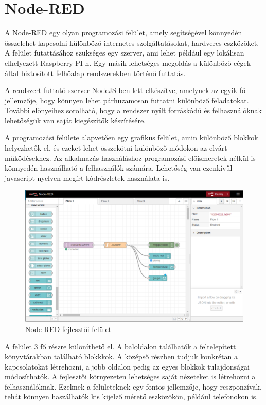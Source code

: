 \section{Node-RED}
A Node-RED egy olyan programozási felület, amely segítségével könnyedén összelehet kapcsolni különböző internetes szolgáltatásokat, hardveres eszközöket. A felület futattásához szükséges egy szerver, ami lehet például egy lokálisan elhelyezett Raspberry PI-n. Egy másik lehetséges megoldás a különböző cégek által biztosított felhőalap rendszerekben történő futtatás.

A rendszert futtató szerver NodeJS-ben lett elkészítve, amelynek az egyik fő jellemzője, hogy könnyen lehet párhuzamosan futtatni különböző feladatokat. További előnyeihez sorolható, hogy a rendszer nyílt forráskódú és felhasználóknak lehetőségük van saját kiegészítők készítésére.

A programozási felülete alapvetően egy grafikus felület, amin különböző blokkok helyezhetők el, és ezeket lehet összekötni különböző módokon az elvárt működésekhez. Az alkalmazás használáshoz programozási előismeretek nélkül is könnyedén használható a felhasználók számára. Lehetőség van ezenkívűl javascript nyelven megírt kódrészletek használata is.

\begin{figure}[!ht]
    \centering
    \includegraphics[width=150mm, keepaspectratio]{figures/nodered.png}
    \caption{Node-RED fejlesztői felület}
    \label{fig:nodered_development}
\end{figure}

A felület 3 fő részre különíthető el. A baloldalon találhatók a feltelepített könyvtárakban található blokkkok. A középső részben tudjuk konkrétan a kapcsolatokat létrehozni, a jobb oldalon pedig az egyes blokkok tulajdonságai módosíthatók. A fejlesztői környezeten lehetséges saját nézeteket is létrehozni a felhasználóknak. Ezeknek a felületeknek egy fontos jellemzője, hogy reszponzívak, tehát könnyen haszálhatók kis kijelző mérető eszközökön, például telefonokon is.

